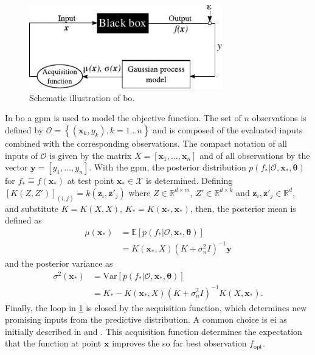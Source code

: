\documentclass{ifacconf}
\newcommand{\bx}{\bm{x}}
\begin{document}
\begin{figure}[tb]
    \centering
    \includegraphics[width=8.4cm]{figs/bb_approach.pdf}
    \caption{Schematic illustration of \acrlong{bo}.}
    \label{fig:overview_bo}
\end{figure}
In \gls{bo} a \gls{gpm} is used to model the objective function.
The set of \(n\) observations is defined by \(\mathcal{O}=\left\{(\bx_k,y_k), k=1\dots n\right\}\) and is composed of the evaluated inputs combined with the corresponding observations. The compact notation of all inputs of \(\mathcal{O}\) is given by the matrix \(X = [\bx_{1}, \dots, \bx_{n}]\) and of all observations by the vector \(\bm{y}=[y_1,\dots,y_n]\). With the \gls{gpm}, the posterior distribution \(p(f_*\vert \mathcal{O},\bx_*,\bm{\theta})\) for \(f_* \widehat{=} f(\bx_*)\) at test point \(\bx_*\in\mathcal{X}\) is determined. Defining \([K(Z,Z')]_{(i,j)} = k(\bm{z}_i,\bm{z}'_j)\) where \(Z\in\mathbb{R}^{d\times m}\), \(Z'\in\mathbb{R}^{d\times k}\) and \(\bm{z}_i,\bm{z}'_j\in \mathbb{R}^d\), and substitute \(K=K(X,X)\), \(K_*=K(\bx_*,\bx_*)\), then, the posterior mean is defined as 
\begin{equation}
\begin{aligned}
    \mu(\bx_*) &= \mathbb{E}\left[p(f_*\vert \mathcal{O},\bx_*,\bm{\theta})\right] \\
                &= K(\bx_*,X)\left(K+\sigma_n^2I\right)^{-1}\bm{y}
\end{aligned}
    \label{eq:post_mean}
\end{equation} 
and the posterior variance as 
\begin{equation}
    \begin{aligned}
    \sigma^2(\bx_*) &= \mathrm{Var}\left[p(f_*\vert \mathcal{O},\bx_*,\bm{\theta})\right]\\
                    &=K_*-K(\bx_*,X)\left(K+\sigma_n^2I\right)^{-1}K(X,\bx_*).
    \end{aligned}
    \label{eq:post_var}
\end{equation}
Finally, the loop in \cref{fig:overview_bo} is closed by the acquisition function, which determines new promising inputs from the predictive distribution. A common choice is \gls{ei} as initially described in \cite{EI2} and \cite{EI}. This acquisition function determines the expectation that the function at point \(\bm{x}\) improves the so far best observation \(f_\mathrm{opt}\). 
\end{document}
